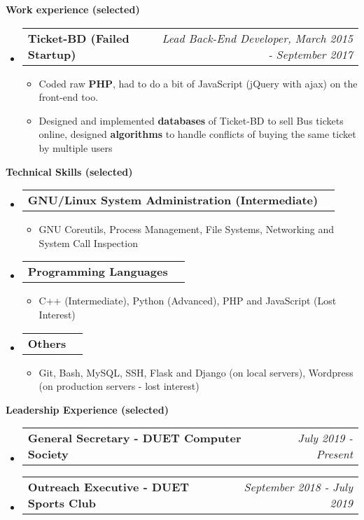 \documentclass[letterpaper,10pt]{article}
\makeatletter
\newcommand{\resheading}[1]{{\large \colorbox{mygrey}{\begin{minipage}{\textwidth}{\textbf{#1 \vphantom{p\^{E}}}}\end{minipage}}}}
\newcommand{\ressubheading}[4]{
	\begin{tabular*}{7.1in}{l@{\extracolsep{\fill}}r}
		\textbf{#1} & \textit{#4} \\
	\end{tabular*}\vspace{-6pt}}
\makeatother
\begin{document}
	\resheading{Work experience (selected)}
	\begin{itemize}
		\item \ressubheading{Ticket-BD (Failed Startup)}{}{}{Lead Back-End Developer, March 2015 - September 2017}
		\begin{itemize}
			\item Coded raw \textbf{PHP}, had to do a bit of JavaScript (jQuery with ajax) on the front-end too.
			\item Designed and implemented \textbf{databases} of Ticket-BD to sell Bus tickets online, designed \textbf{algorithms} to handle conflicts of buying the same ticket by multiple users 
		\end{itemize}
		
	\end{itemize}


	\vspace{0.2in}
	
	\resheading{Technical Skills (selected)}
	\begin{itemize}
		
		\item \ressubheading{GNU/Linux System Administration (Intermediate) }{}{}{}
		\begin{itemize}
			\item GNU Coreutils, Process Management, File Systems, Networking and System Call Inspection
		\end{itemize}
	
		\item \ressubheading{Programming Languages}{}{}{}
		\begin{itemize}
			\item C++ (Intermediate), Python (Advanced), PHP and JavaScript (Lost Interest)
		\end{itemize}
	
		\item \ressubheading{Others}{}{}{}
		\begin{itemize}
			\item Git, Bash, MySQL, SSH, Flask and Django (on local servers), Wordpress (on production servers - lost interest)
		\end{itemize}
			
			
		\end{itemize}
	
	\vspace{0.2in}
	
	\resheading{Leadership Experience (selected)}
	\begin{itemize}
		\item \ressubheading{General Secretary - DUET Computer Society}{}{}{July 2019 - Present}
		\item \ressubheading{Outreach Executive - DUET Sports Club}{}{}{September 2018 - July 2019}
		
	\end{itemize}
\end{document}
